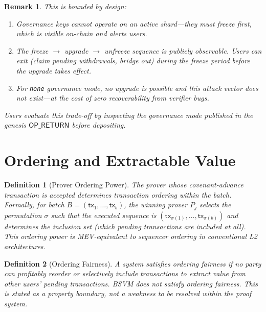 \documentclass[11pt,a4paper]{article}
\newtheorem{definition}{Definition}[section]
\newtheorem{remark}{Remark}[section]
\begin{document}
\begin{remark}
This is bounded by design:
\begin{enumerate}[nosep]
    \item Governance keys \emph{cannot} operate on an active shard---they must freeze first, which is visible on-chain and alerts users.
    \item The freeze $\to$ upgrade $\to$ unfreeze sequence is publicly observable. Users can exit (claim pending withdrawals, bridge out) during the freeze period before the upgrade takes effect.
    \item For \texttt{none} governance mode, no upgrade is possible and this attack vector does not exist---at the cost of zero recoverability from verifier bugs.
\end{enumerate}
Users evaluate this trade-off by inspecting the governance mode published in the genesis $\mathsf{OP\_RETURN}$ before depositing.
\end{remark}


\section{Ordering and Extractable Value}\label{sec:mev}

\begin{definition}[Prover Ordering Power]\label{def:mev}
The prover whose covenant-advance transaction is accepted determines transaction ordering within the batch. Formally, for batch $B = (\mathsf{tx}_1, \ldots, \mathsf{tx}_b)$, the winning prover $P_j$ selects the permutation $\sigma$ such that the executed sequence is $(\mathsf{tx}_{\sigma(1)}, \ldots, \mathsf{tx}_{\sigma(b)})$ and determines the inclusion set (which pending transactions are included at all). This ordering power is MEV-equivalent to sequencer ordering in conventional L2 architectures.
\end{definition}

\begin{definition}[Ordering Fairness]\label{def:fairness}
A system satisfies \emph{ordering fairness} if no party can profitably reorder or selectively include transactions to extract value from other users' pending transactions. BSVM does \emph{not} satisfy ordering fairness. This is stated as a property boundary, not a weakness to be resolved within the proof system.
\end{definition}
\end{document}
